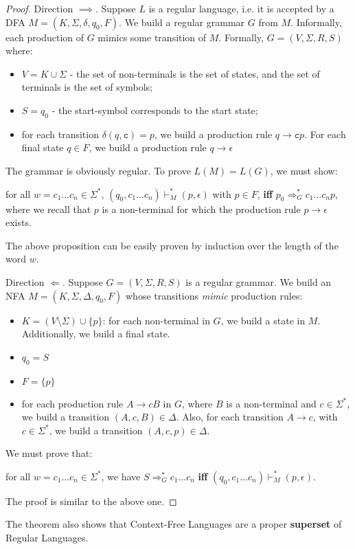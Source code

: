 \documentclass[a4paper, 12pt]{article}
\begin{document}
\begin{proof}

Direction $\implies$. Suppose $L$ is a regular language, i.e. it is accepted by a DFA $M=(K,\Sigma,\delta,q_0,F)$. We build a regular grammar $G$ from $M$. Informally, each production of $G$ mimics some transition of $M$. Formally, $G=(V,\Sigma,R,S)$ where:
  \begin{itemize}
  	\item  $V = K \cup \Sigma$ - the set of non-terminals is the set of states, and the set of terminals is the set of symbols;
  	\item  $S = q_0$ - the start-symbol corresponds to the start state;
  	\item  for each transition $\delta(q,\texttt{c})=p$, we build a production rule $q\rightarrow \texttt{c}p$. For each final state $q\in F$, we build a production rule $q\rightarrow \epsilon$
  \end{itemize}

The grammar is obviously regular.
To prove $L(M)=L(G)$, we must show:

for all $w=c_1\ldots c_n\in\Sigma^*$, $(q_0,c_1\ldots c_n)\vdash_M^* (p,\epsilon)$ with $p\in F$, \textbf{iff} $p_0\Rightarrow_G^* c_1\ldots c_np$, where we recall that $p$ is a non-terminal for which the production rule $p\rightarrow \epsilon$ exists.

The above proposition can be easily proven by induction over the length of the word $w$.

Direction $\Leftarrow$. Suppose $G=(V,\Sigma,R,S)$ is a regular grammar. We build an NFA $M=(K,\Sigma,\Delta,q_0,F)$ whose transitions \textit{mimic} production rules:
  \begin{itemize}
  	\item  $K = (V\setminus \Sigma) \cup \{p\}$: for each non-terminal in $G$, we build a state in $M$. Additionally, we build a final state.
  	\item  $q_0 = S$
  	\item  $F=\{p\}$
  	\item  for each production rule $A\rightarrow cB$ in $G$, where $B$ is a non-terminal and $c\in\Sigma^*$, we build a transition $(A,c,B)\in\Delta$. Also, for each transition $A\rightarrow c$, with $c\in\Sigma^*$, we build a transition $(A,c,p)\in\Delta$.
  \end{itemize}

We must prove that:

for all $w=c_1\ldots c_n\in\Sigma^*$, we have $S\Rightarrow_G^* c_1\ldots c_n$ \textbf{iff} $(q_0,c_1\ldots c_n)\vdash_M^*(p,\epsilon)$.

The proof is similar to the above one.

\end{proof}

The theorem also shows that Context-Free Languages are a proper \textbf{superset} of Regular Languages.
\end{document}
